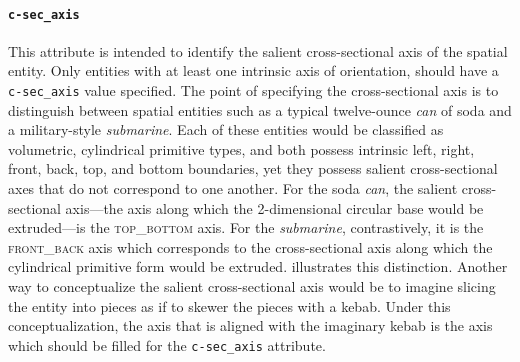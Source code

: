 \documentclass[11pt]{article}
\begin{document}
\paragraph{\texttt{c-sec\_axis}} %
\label{par:c_sec_axis}
This attribute is intended to identify the salient cross-sectional axis of the spatial entity. Only entities with at least one intrinsic axis of orientation, should have a \texttt{c-sec\_axis} value specified. The point of specifying the cross-sectional axis is to distinguish between spatial entities such as a typical twelve-ounce \emph{can} of soda and a military-style \emph{submarine}. Each of these entities would be classified as volumetric, cylindrical primitive types, and both possess intrinsic left, right, front, back, top, and bottom boundaries, yet they possess salient cross-sectional axes that do not correspond to one another. For the soda \emph{can}, the salient cross-sectional axis---the axis along which the 2-dimensional circular base would be extruded---is the \textsc{top\_bottom} axis. For the \emph{submarine}, contrastively, it is the \textsc{front\_back} axis which corresponds to the cross-sectional axis along which the cylindrical primitive form would be extruded.  illustrates this distinction. Another way to conceptualize the salient cross-sectional axis would be to imagine slicing the entity into pieces as if to skewer the pieces with a kebab. Under this conceptualization, the axis that is aligned with the imaginary kebab is the axis which should be filled for the \texttt{c-sec\_axis} attribute.
\end{document}
